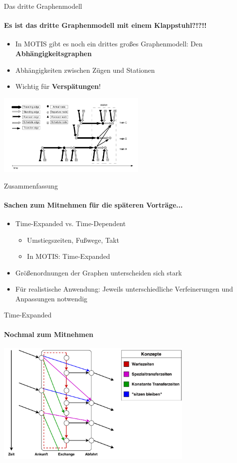 \begin{frame}{Das dritte Graphenmodell}
	\framesubtitle{Es ist das dritte Graphenmodell mit einem Klappstuhl?!?!!}
	
	\begin{itemize}
		\item In MOTIS gibt es noch ein drittes großes Graphenmodell: Den \textbf{Abhängigkeitsgraphen}
		\item Abhängigkeiten zwischen Zügen und Stationen
		\item Wichtig für \textbf{Verspätungen}!
	\end{itemize}

	\begin{center}
		\includegraphics[height=4cm]{images/dependency/dependency-graph.pdf} 
	\end{center}
\end{frame}


\begin{frame}{Zusammenfassung}
	\framesubtitle{Sachen zum Mitnehmen für die späteren Vorträge...}
	\begin{itemize}
		\item Time-Expanded vs. Time-Dependent
		\begin{itemize}
			\item Umstiegszeiten, Fußwege, Takt
			\item In MOTIS: Time-Expanded
		\end{itemize}
		\item Größenordnungen der Graphen unterscheiden sich stark
		\item Für realistische Anwendung: Jeweils unterschiedliche Verfeinerungen und Anpassungen notwendig
	\end{itemize}

\end{frame}

\begin{frame}{Time-Expanded}
	\framesubtitle{Nochmal zum Mitnehmen}
	\begin{center}
		\includegraphics[height=6cm]{images/time-expanded/overview.pdf} 
	\end{center}
\end{frame}